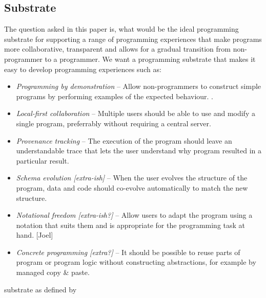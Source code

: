\documentclass[sigconf]{acmart}
\begin{document}
\subsection{Substrate}

The question asked in this paper is, what would be the ideal programming substrate
for supporting a range of programming experiences that make programs more
collaborative, transparent and allows for a gradual transition from non-programmer
to a programmer. We want a programming substrate that makes it easy to develop
programming experiences such as:

\begin{itemize}
\item \emph{Programming by demonstration} --
  Allow non-programmers to construct simple programs by performing examples of the expected behaviour. \cite{leiva-2021-rapido}.
\item \emph{Local-first collaboration} --
  Multiple users should be able to use and modify a single program, preferrably without requiring a central server. \cite{kleppmann-2019-local}
\item \emph{Provenance tracking} --
  The execution of the program should leave an understandable trace that lets the user understand why program resulted in a particular result.
\item \emph{Schema evolution [extra-ish]} --
  When the user evolves the structure of the program, data and code should co-evolve automatically to match the new structure.
\item \emph{Notational freedom [extra-ish?]} --
  Allow users to adapt the program using a notation that suits them and is appropriate for the programming task at hand. [Joel]
\item \emph{Concrete programming [extra?]} --
  It should be possible to reuse parts of program or program logic without constructing abstractions, for example by managed copy \& paste.\cite{edwards-2006-copypaste,edwards-2022-copypaste}
\end{itemize}

substrate as defined by \cite{jakubovic-2022-ladder}

\cite{leiva-2021-rapido,cypher-1993-pbd}
\cite{chen-2023-miwa}

\cite{kleppmann-2019-local,klokmose-2024-mywebstrates}
\cite{ko-2004-whyline,ko-2009-whyline,krebs-2023-probelog}
\cite{ricciotti-2017-imperative,perera-2012-functional}
\cite{perera-2022-linked}
\end{document}
